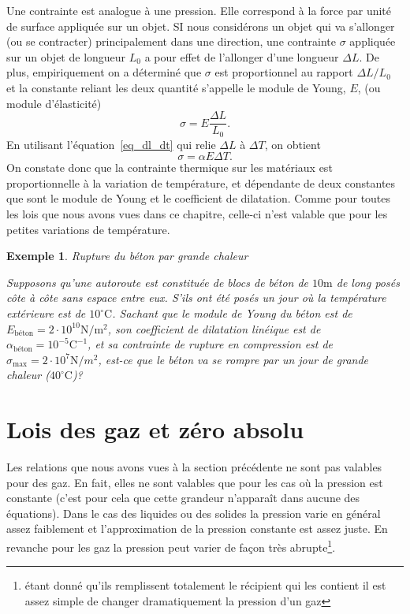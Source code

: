 \documentclass[a4paper,12pt]{book}
\newtheorem*{exemple}{Exemple}
\newcommand{\m}{\mathrm{m}}
\newcommand{\C}{\mathrm{C}}
\newcommand{\N}{\mathrm{N}}
\begin{document}
Une contrainte est analogue à une pression. Elle correspond à la
force par unité de surface appliquée sur un objet.
SI nous considérons un objet qui va s'allonger (ou se contracter) principalement dans une direction, une contrainte $\sigma$ appliquée sur un objet de longueur $L_0$ a pour effet de l'allonger d'une longueur $\Delta L$. De plus, 
empiriquement on a déterminé que $\sigma$ est proportionnel 
au rapport $\Delta L/L_0$ et la constante reliant les deux quantité s'appelle le module de Young, $E$, (ou module d'élasticité)
\begin{equation}
\sigma=E\frac{\Delta L}{L_0}.
\end{equation}
En utilisant l'équation~\eqref{eq_dl_dt} qui relie $\Delta L$ à $\Delta T$, on obtient
\begin{equation}
\sigma=\alpha E \Delta T.
\end{equation}
On constate donc que la contrainte thermique sur les matériaux est proportionnelle à la variation de température, et dépendante 
de deux constantes que sont le module de Young et le coefficient de dilatation. Comme pour toutes les lois que nous avons vues dans ce chapitre, celle-ci n'est valable que pour les petites variations de température.
\begin{exemple}{Rupture du béton par grande chaleur}

Supposons qu'une autoroute est constituée de blocs de béton
de $10\m$ de long posés côte à côte sans espace entre eux. S'ils ont été posés un jour où la température extérieure est de $10^\circ\C$. Sachant que le module de Young du béton est de $E_{\mbox{béton}}=2\cdot10^{10}\N/\m^2$, 
son coefficient de dilatation linéique est de $\alpha_{\mbox{béton}}=10^{-5}\C^{-1}$, et sa contrainte de rupture en compression est de $\sigma_{\mbox{max}}=2\cdot 10^7 \N/m^2$, est-ce que le béton 
va se rompre par un jour de grande chaleur ($40^\circ\C$)?
\end{exemple}

\section{Lois des gaz et zéro absolu}

Les relations que nous avons vues à la section précédente
ne sont pas valables pour des gaz. En fait, elles ne sont valables que pour les cas où la pression est constante (c'est pour cela que cette grandeur n'apparaît dans aucune des 
équations). Dans le cas des liquides ou des solides la
pression varie en général assez faiblement et l'approximation 
de la pression constante est assez juste. En revanche pour les
gaz la pression peut varier de façon très abrupte\footnote{étant donné qu'ils remplissent totalement le récipient qui les contient il est assez simple de changer dramatiquement la pression d'un gaz}. 
\end{document}
